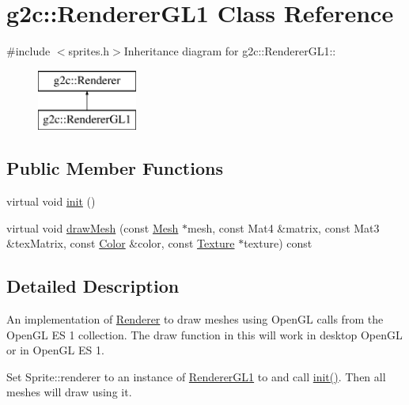 \hypertarget{classg2c_1_1_renderer_g_l1}{
\section{g2c::RendererGL1 Class Reference}
\label{classg2c_1_1_renderer_g_l1}
}


{\ttfamily \#include $<$sprites.h$>$}Inheritance diagram for g2c::RendererGL1::\begin{figure}[H]
\begin{center}
\leavevmode
\includegraphics[height=2cm]{classg2c_1_1_renderer_g_l1}
\end{center}
\end{figure}
\subsection*{Public Member Functions}
\begin{DoxyCompactItemize}
\item 
virtual void \hyperlink{classg2c_1_1_renderer_g_l1_a3577eea69cf61c38dc3595b24251fab7}{init} ()
\item 
virtual void \hyperlink{classg2c_1_1_renderer_g_l1_a26b67e30372294a022b981fa6b0d76c4}{drawMesh} (const \hyperlink{classg2c_1_1_mesh}{Mesh} $\ast$mesh, const Mat4 \&matrix, const Mat3 \&texMatrix, const \hyperlink{classg2c_1_1_color}{Color} \&color, const \hyperlink{classg2c_1_1_texture}{Texture} $\ast$texture) const 
\end{DoxyCompactItemize}


\subsection{Detailed Description}
An implementation of \hyperlink{classg2c_1_1_renderer}{Renderer} to draw meshes using OpenGL calls from the OpenGL ES 1 collection. The draw function in this will work in desktop OpenGL or in OpenGL ES 1.

Set Sprite::renderer to an instance of \hyperlink{classg2c_1_1_renderer_g_l1}{RendererGL1} to and call \hyperlink{classg2c_1_1_renderer_g_l1_a3577eea69cf61c38dc3595b24251fab7}{init()}. Then all meshes will draw using it. 

